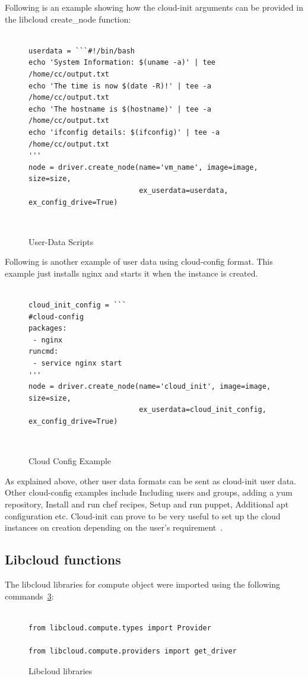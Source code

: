 Following is an example showing how the cloud-init arguments can be provided 
in the libcloud create\_node function:

\begin{figure}[htb]
\begin{verbatim}

userdata = ```#!/bin/bash
echo 'System Information: $(uname -a)' | tee /home/cc/output.txt
echo 'The time is now $(date -R)!' | tee -a /home/cc/output.txt
echo 'The hostname is $(hostname)' | tee -a /home/cc/output.txt
echo 'ifconfig details: $(ifconfig)' | tee -a /home/cc/output.txt
'''
node = driver.create_node(name='vm_name', image=image, size=size,
                          ex_userdata=userdata, ex_config_drive=True)
\end{verbatim}
\caption{User-Data Scripts}
~\cite{hid-sp18-516-www-cloud-init}\label{c:cloud-init-example1}
\end{figure}

Following is another example of user data using cloud-config format. This
example just installs nginx and starts it when the instance is created.

\begin{figure}[htb]
\begin{verbatim}

cloud_init_config = ```
#cloud-config
packages:
 - nginx
runcmd:
 - service nginx start
'''
node = driver.create_node(name='cloud_init', image=image, size=size,
                          ex_userdata=cloud_init_config, ex_config_drive=True)
\end{verbatim}
\caption{Cloud Config Example}
~\cite{hid-sp18-516-www-libcloud-functions}\label{c:cloud-init-example2}
\end{figure}

As explained above, other user data formats can be sent as cloud-init user 
data. Other cloud-config examples include Including users and groups, adding 
a yum repository, Install and run chef recipes, Setup and run puppet, 
Additional apt configuration etc. Cloud-init can prove to be very useful to 
set up the cloud instances on creation depending on the user's
requirement~\cite{hid-sp18-516-www-cloud-init}.

\subsection{Libcloud functions}
The libcloud libraries for compute object were imported using the following
commands~\ref{c:libcloud-libraries}:
\begin{figure}[htb]

\begin{verbatim}

from libcloud.compute.types import Provider

from libcloud.compute.providers import get_driver

\end{verbatim}

\caption{Libcloud libraries
~\cite{hid-sp18-516-www-libcloud-functions}}\label{c:libcloud-libraries}

\end{figure}

